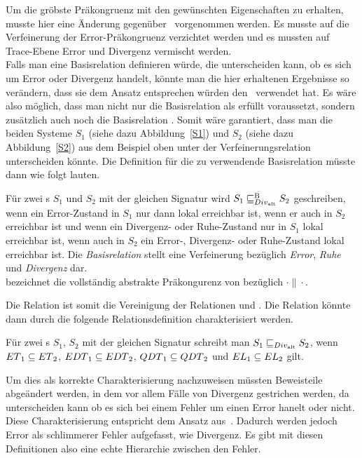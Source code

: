 Um die gröbste Präkongruenz mit den gewünschten Eigenschaften zu erhalten,
musste hier eine Änderung gegenüber~\cite{Chilton2013} vorgenommen werden. Es
musste auf die Verfeinerung der Error-Präkongruenz verzichtet werden und es
mussten auf Trace-Ebene Error und Divergenz vermischt werden.\\
Falls man eine Basisrelation definieren würde, die unterscheiden kann, ob es
sich um Error oder Divergenz handelt, könnte man die hier erhaltenen
Ergebnisse so verändern, dass sie dem Ansatz entsprechen würden
den~\cite{Chilton2013} verwendet hat. Es wäre also möglich, dass man nicht nur
die Basisrelation \DBRel{} als erfüllt voraussetzt, sondern zusätzlich auch
noch die Basisrelation \EBRel{}. Somit wäre garantiert, dass man die beiden
Systeme $S_1$ (siehe dazu Abbildung~\ref{S1}) und $S_2$ (siehe dazu
Abbildung~\ref{S2}) aus dem Beispiel oben unter der Verfeinerungsrelation
unterscheiden könnte. Die Definition für die zu verwendende Basisrelation
müsste dann wie folgt lauten.

\begin{Def}
  Für zwei \EIO{}s $S_1$ und $S_2$ mit der gleichen Signatur wird $S_1\sqsubseteq _{Div_{\mathrm{alt}}}^\mathrm{B}{}
  S_2$ geschreiben, wenn ein Error-Zustand in $S_1$ nur dann lokal erreichbar
  ist, wenn er auch in $S_2$ erreichbar ist und wenn ein Divergenz- oder
  Ruhe-Zustand nur in $S_1$ lokal erreichbar ist, wenn auch in $S_2$ ein
  Error-, Divergenz- oder Ruhe-Zustand lokal erreichbar ist. Die
  \emph{Basisrelation} stellt eine Verfeinerung bezüglich \emph{Error},
  \emph{Ruhe} und \emph{Divergenz} dar.\\
  \DCaRel{} bezeichnet die vollständig abstrakte Präkongurenz von \DBaRel{}
  bezüglich $\cdot\|\cdot$.
\end{Def}

Die Relation \DBaRel{} ist somit die Vereinigung der Relationen \EBRel und
\DBRel{}. Die Relation \DCaRel{} könnte dann durch die folgende
Relationsdefinition charakterisiert werden.

\begin{Def}
  Für zwei \EIO{}s $S_1$, $S_2$ mit der gleichen Signatur schreibt man
  $S_1\sqsubseteq _{Div_{\mathrm{alt}}}{} S_2$, wenn $ET{}_1\subseteq ET{}_2$, $EDT{}_1\subseteq
  EDT{}_2$, $QDT{}_1\subseteq QDT{}_2$ und $EL{}_1\subseteq EL{}_2$ gilt.
\end{Def}

Um dies als korrekte Charakterisierung nachzuweisen müssten Beweisteile
abgeändert werden, in dem vor allem Fälle von Divergenz gestrichen werden, da
\DBaRel{} unterscheiden kann ob es sich bei einem Fehler um einen Error hanelt
oder nicht. Diese Charakterisierung \DaRel{} entspricht dem Ansatz
aus~\cite{Chilton2013}. Dadurch werden jedoch Error als \glqq{}schlimmerer
Fehler\grqq{} aufgefasst, wie Divergenz. Es gibt mit diesen Definitionen also
eine echte Hierarchie zwischen den Fehler.



